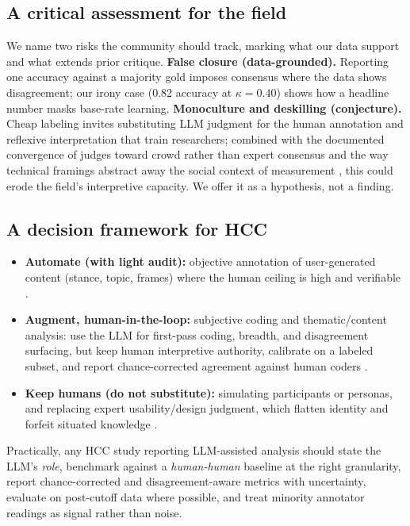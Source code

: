 \subsection{A critical assessment for the field}
We name two risks the community should track, marking what our data support and what extends prior critique.
\textbf{False closure (data-grounded).} Reporting one accuracy against a majority gold imposes consensus where the
data shows disagreement; our irony case (0.82 accuracy at $\kappa{=}0.40$) shows how a headline number masks
base-rate learning. \textbf{Monoculture and deskilling (conjecture).} Cheap labeling invites substituting LLM
judgment for the human annotation and reflexive interpretation that train researchers; combined with the documented
convergence of judges toward crowd rather than expert consensus \citep{bavaresco2024judgebench} and the way
technical framings abstract away the social context of measurement \citep{selbst2019abstraction,suchman2007humanmachine},
this could erode the field's interpretive capacity. We offer it as a hypothesis, not a finding.

\subsection{A decision framework for HCC}
\begin{itemize}[leftmargin=1.4em,itemsep=2pt]
\item \textbf{Automate (with light audit):} objective annotation of user-generated content (stance, topic, frames)
where the human ceiling is high and verifiable \citep{gilardi2023chatgpt,tornberg2023political}.
\item \textbf{Augment, human-in-the-loop:} subjective coding and thematic/content analysis: use the LLM for
first-pass coding, breadth, and disagreement surfacing, but keep human interpretive authority, calibrate on a
labeled subset, and report chance-corrected agreement against human coders \citep{gao2024collabcoder,dai2023llminloop}.
\item \textbf{Keep humans (do not substitute):} simulating participants or personas, and replacing expert
usability/design judgment, which flatten identity and forfeit situated knowledge
\citep{wang2024flatten,guerino2025gpt4ousability,salminen2025syntheticcritical}.
\end{itemize}
Practically, any HCC study reporting LLM-assisted analysis should state the LLM's \emph{role}, benchmark against a
\emph{human-human} baseline at the right granularity, report chance-corrected and disagreement-aware metrics with
uncertainty, evaluate on post-cutoff data where possible, and treat minority annotator readings as signal rather
than noise.
